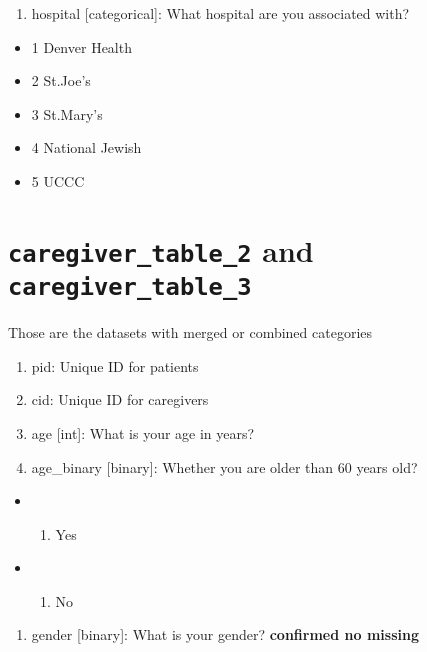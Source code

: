 \documentclass[
  letterpaper,
  DIV=11,
  numbers=noendperiod]{scrreprt}
\providecommand{\tightlist}{%
  \setlength{\itemsep}{0pt}\setlength{\parskip}{0pt}}\usepackage{longtable,booktabs,array}
\begin{document}
\begin{enumerate}
\def\labelenumi{\arabic{enumi}.}
\setcounter{enumi}{20}
\tightlist
\item
  hospital {[}categorical{]}: What hospital are you associated with?
\end{enumerate}

\begin{itemize}
\tightlist
\item
  1 Denver Health
\item
  2 St.Joe's
\item
  3 St.Mary's
\item
  4 National Jewish
\item
  5 UCCC
\end{itemize}

\hypertarget{caregiver_table_2-and-caregiver_table_3}{%
\section{\texorpdfstring{\texttt{caregiver\_table\_2} and
\texttt{caregiver\_table\_3}}{caregiver\_table\_2 and caregiver\_table\_3}}\label{caregiver_table_2-and-caregiver_table_3}}

Those are the datasets with merged or combined categories

\begin{enumerate}
\def\labelenumi{\arabic{enumi}.}
\item
  pid: Unique ID for patients
\item
  cid: Unique ID for caregivers
\item
  age {[}int{]}: What is your age in years?
\item
  age\_binary {[}binary{]}: Whether you are older than 60 years old?
\end{enumerate}

\begin{itemize}
\item
  \begin{enumerate}
  \def\labelenumi{\arabic{enumi}.}
  \tightlist
  \item
    Yes
  \end{enumerate}
\item
  \begin{enumerate}
  \def\labelenumi{\arabic{enumi}.}
  \setcounter{enumi}{1}
  \tightlist
  \item
    No
  \end{enumerate}
\end{itemize}

\begin{enumerate}
\def\labelenumi{\arabic{enumi}.}
\setcounter{enumi}{4}
\tightlist
\item
  gender {[}binary{]}: What is your gender? \textbf{confirmed no
  missing}
\end{enumerate}
\end{document}
